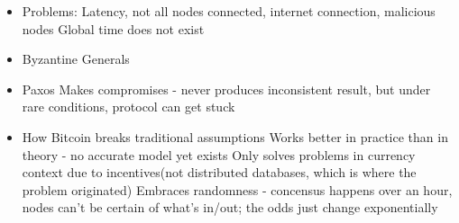 \documentclass{article}
\begin{document}
\begin{itemize}
  \item Problems:
    \subitem Latency, not all nodes connected, internet connection, malicious nodes
    \subitem Global time does not exist
  \item Byzantine Generals
  \item Paxos
    \subitem Makes compromises - never produces inconsistent result, but under rare conditions, protocol can get stuck
  \item How Bitcoin breaks traditional assumptions
    \subitem Works better in practice than in theory - no accurate model yet exists
    \subitem Only solves problems in currency context due to incentives(not distributed databases, which is where the problem originated)
    \subitem Embraces randomness - concensus happens over an hour, nodes can't be certain of what's in/out; the odds just change exponentially
    

\end{itemize}
\end{document}
